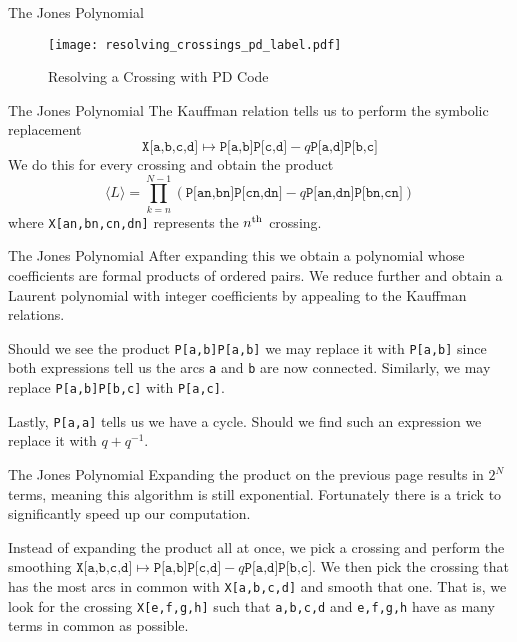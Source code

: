 \documentclass{beamer}
\begin{document}
    \begin{frame}{The Jones Polynomial}
        \begin{figure}
            \centering
            \texttt{[image: resolving\_crossings\_pd\_label.pdf]}
            \caption{Resolving a Crossing with PD Code}
        \end{figure}
    \end{frame}
    \begin{frame}{The Jones Polynomial}
        The Kauffman relation tells us to perform the symbolic replacement
        \begin{equation}
            \texttt{X[a,b,c,d]}\mapsto\texttt{P[a,b]P[c,d]}-q\texttt{P[a,d]P[b,c]}
        \end{equation}
        We do this for every crossing and obtain the product
        \begin{equation}
            \langle{L}\rangle
            =\prod_{k=n}^{N-1}
            (\texttt{P[an,bn]P[cn,dn]}-q\texttt{P[an,dn]P[bn,cn]})
        \end{equation}
        where \texttt{X[an,bn,cn,dn]} represents the
        $n^{\small\textrm{th}}$ crossing.
    \end{frame}
    \begin{frame}{The Jones Polynomial}
        After expanding this we obtain a polynomial whose coefficients are
        formal products of ordered pairs. We reduce further and obtain a
        Laurent polynomial with integer coefficients by appealing to the
        Kauffman relations.
        \par\hfill\par
        Should we see the product
        \texttt{P[a,b]P[a,b]} we may replace it with \texttt{P[a,b]} since
        both expressions tell us the arcs \texttt{a} and \texttt{b} are now
        connected. Similarly, we may replace \texttt{P[a,b]P[b,c]} with
        \texttt{P[a,c]}.
        \par\hfill\par
        Lastly, \texttt{P[a,a]} tells us we have a cycle. Should we find
        such an expression we replace it with $q+q^{-1}$.
    \end{frame}
    \begin{frame}{The Jones Polynomial}
        Expanding the product on the previous page results in $2^{N}$
        terms, meaning this algorithm is still exponential. Fortunately there
        is a trick to significantly speed up our computation.
        \par\hfill\par
        Instead of expanding the product all at once, we pick a crossing and
        perform the smoothing
        $\texttt{X[a,b,c,d]}\mapsto\texttt{P[a,b]P[c,d]}-q\texttt{P[a,d]P[b,c]}$.
        We then pick the crossing that has the most arcs in common with
        \texttt{X[a,b,c,d]} and smooth that one. That is, we look for the
        crossing \texttt{X[e,f,g,h]} such that
        \texttt{a,b,c,d} and \texttt{e,f,g,h} have as many terms in common as
        possible.
    \end{frame}
\end{document}

